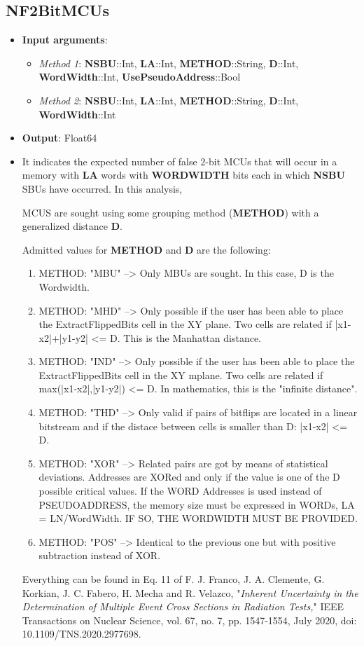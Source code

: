\subsection*{NF2BitMCUs}
%
\begin{itemize}
	\item \textbf{Input arguments}: 
		\begin{itemize}
			\item \textit{Method 1}: \textbf{NSBU}::Int, \textbf{LA}::Int, \textbf{METHOD}::String, \textbf{D}::Int, \textbf{WordWidth}::Int, \textbf{UsePseudoAddress}::Bool
			\item \textit{Method 2}: \textbf{NSBU}::Int, \textbf{LA}::Int, \textbf{METHOD}::String, \textbf{D}::Int, \textbf{WordWidth}::Int
		\end{itemize}
	\item \textbf{Output}: Float64
	\item It indicates the expected number of false 2-bit MCUs that will occur 
	 in a memory with \textbf{LA} words with \textbf{WORDWIDTH} bits each in which \textbf{NSBU} SBUs have occurred. In this analysis,
	
	 MCUS are sought using some grouping method (\textbf{METHOD}) with a generalized distance \textbf{D}.
	
	 Admitted values for \textbf{METHOD} and \textbf{D} are the following:
	 
	 \begin{enumerate}
	 	\item METHOD: "MBU" --> Only MBUs are sought. In this case, D is the Wordwidth.
	 	\item METHOD: "MHD" --> Only possible if the user has been able to place the ExtractFlippedBits 	 	cell in the XY plane. Two cells are related if |x1-x2|+|y1-y2| <= D. This 
	 	is the Manhattan distance.
	 	\item METHOD: "IND" --> Only possible if the user has been able to place the ExtractFlippedBits
	 	cell in the XY mplane. Two cells are related if max(|x1-x2|,|y1-y2|) <= D.
	 	In mathematics, this is the "infinite distance".
	 	\item METHOD: "THD" --> Only valid if pairs of bitflips are located in a linear bitstream and if the
	 	distace between cells is smaller than D: |x1-x2| <= D.
	 	\item METHOD: "XOR" --> Related pairs are got by means of statistical deviations. Addresses are XORed 
	 	and only if the value is one of the D possible critical values. If the WORD Addresses  
	 	is used instead of PSEUDOADDRESS, the memory size must be expressed in WORDs, 
	 	LA = LN/WordWidth.
	 	IF SO, THE WORDWIDTH MUST BE PROVIDED.
	 	\item METHOD: "POS" --> Identical to the previous one but with positive subtraction instead of XOR.
	 \end{enumerate}
	 
	   Everything can be found in Eq. 11 of F. J. Franco, J. A. Clemente, G. Korkian, 
	   J. C. Fabero, H. Mecha and R. Velazco, "\textit{Inherent Uncertainty in the Determination of Multiple 
	   Event Cross Sections in Radiation Tests,}" IEEE Transactions on Nuclear Science, vol. 67, no. 7, 
	   pp. 1547-1554, July 2020, doi: 10.1109/TNS.2020.2977698.
\end{itemize}
%
